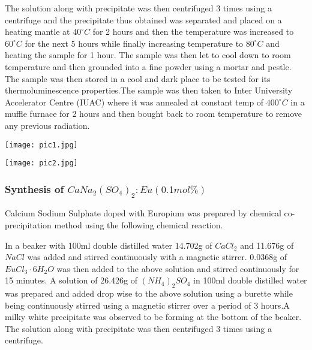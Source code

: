 \documentclass[../experiment.tex]{subfiles}
\begin{document}
        The solution along with precipitate was then centrifuged 3 times using a centrifuge and the precipitate
        thus obtained was separated and placed on a heating mantle at $40^{\circ}C$ for 2 hours and then the temperature was
        increased to $60^{\circ}C$ for the next 5 hours while finally increasing temperature to $80^{\circ}C$ and heating the sample for
        1 hour. The sample was then let to cool down to room temperature and then grounded into a fine powder using
        a mortar and pestle. The sample was then stored in a cool and dark place to be tested for its thermoluminescence
        properties.The sample was then taken to Inter University Accelerator Centre (IUAC) where it was annealed at
        constant temp of $400^{\circ}C$ in a muffle furnace for 2 hours and then bought back to room temperature to remove
        any previous radiation.
        \FloatBarrier\begin{multicols}{2}
            \begin{Figure}
                \centering
                \texttt{[image: pic1.jpg]}
                \label{fig:pic1}
            \end{Figure}
            \begin{Figure}
                \centering
                \texttt{[image: pic2.jpg]}
                \label{fig:pic2}
            \end{Figure}
        \end{multicols}
    \subsubsection{Synthesis of $CaNa_2{(SO_4)}_2:Eu(0.1 mol\%)$}
        Calcium Sodium Sulphate doped with Europium was prepared by chemical co-precipitation method using the following chemical reaction.
        \begin{center}
        \end{center}
        In a beaker with 100ml double distilled water 14.702g of $CaCl_2$ and 11.676g of $NaCl$ was added and stirred
        continuously with a magnetic stirrer. 0.0368g of $EuCl_{3}{\cdot}6H_2O$ was then added to the above solution and stirred
        continuously for 15 minutes. A solution of 26.426g of ${(NH_4)}_{2}SO_4$ in 100ml double distilled water was prepared
        and added drop wise to the above solution using a burette while being continuously stirred using a magnetic
        stirrer over a period of 3 hours.A milky white precipitate was observed to be forming at the bottom of the
        beaker. The solution along with precipitate was then centrifuged 3 times using a centrifuge.
\end{document}

